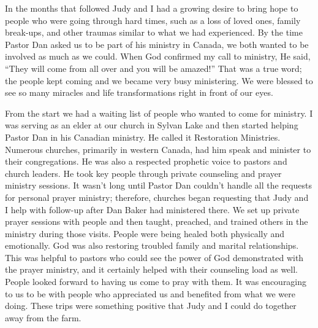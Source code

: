 \documentclass[twoside, 12pt]{book}
\begin{document}
In the months that followed Judy and I had a growing desire to bring hope to people who were going through hard times, such as a loss of loved ones, family break-ups, and other traumas similar to what we had experienced. By the time Pastor Dan asked us to be part of his ministry in Canada, we both wanted to be involved as much as we could. When God confirmed my call to ministry, He said, “They will come from all over and you will be amazed!” That was a true word; the people kept coming and we became very busy ministering. We were blessed to see so many miracles and life transformations right in front of our eyes. 

From the start we had a waiting list of people who wanted to come for ministry. I was serving as an elder at our church in Sylvan Lake and then started helping Pastor Dan in his Canadian ministry. He called it Restoration Ministries. Numerous churches, primarily in western Canada, had him speak and minister to their congregations. He was also a respected prophetic voice to pastors and church leaders. He took key people through private counseling and prayer ministry sessions. It wasn’t long until Pastor Dan couldn’t handle all the requests for personal prayer ministry; therefore, churches began requesting that Judy and I help with follow-up after Dan Baker had ministered there. We set up private prayer sessions with people and then taught, preached, and trained others in the ministry during those visits. People were being healed both physically and emotionally. God was also restoring troubled family and marital relationships. This was helpful to pastors who could see the power of God demonstrated with the prayer ministry, and it certainly helped with their counseling load as well. People looked forward to having us come to pray with them. It was encouraging to us to be with people who appreciated us and benefited from what we were doing. These trips were something positive that Judy and I could do together away from the farm.
\end{document}
